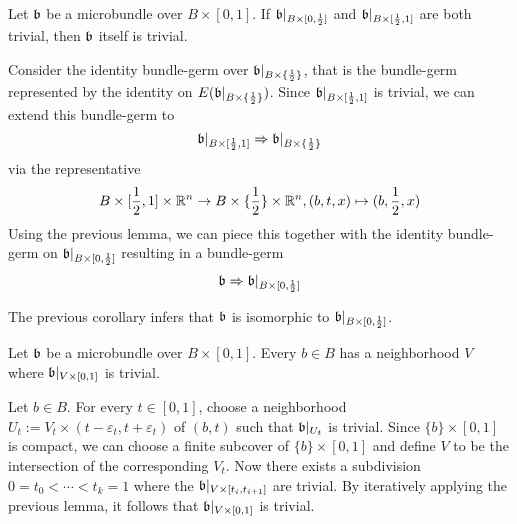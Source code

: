 \begin{file}
\newcommand{\A}[1][] {
    A_\alpha#1
}

\newcommand{\bbleft} {
    \bb\restr{B \times{} [0, \half]}
}
\newcommand{\bbright} {
    \bb\restr{B \times{} [\half, 1]}
}
\newcommand{\bbhalf} {
    \bb\restr{B \times{} \{ \half \}}
}

\begin{mylemma}\label{homotopy::lemma1}
    Let $\mathfrak{b}$ be a microbundle over $B \times [0, 1]$. If $\bbleft$ and $\bbright$ are both trivial,
    then $\mathfrak{b}$ itself is trivial.
\end{mylemma}
\begin{myproof}
    Consider the identity bundle-germ over $\bbhalf$, that is the bundle-germ represented by the identity on $E(\bbhalf)$.
    Since $\bbright$ is trivial, we can extend this bundle-germ to 
    \[ \bbright \double \bbhalf \]
    via the representative
    \[ B \times [\frac{1}{2}, 1] \times \mathbb{R}^n \to B \times \{\frac{1}{2}\} \times \mathbb{R}^n, (b, t, x) \mapsto (b, \frac{1}{2}, x) \]
    Using the previous lemma, we can piece this together with the identity bundle-germ on $\bbleft$ resulting in a bundle-germ
    \[ \bb \double \bbleft \]

    The previous corollary infers that $\mathfrak{b}$ is isomorphic to $\bbleft$.
\end{myproof}

\begin{mylemma}\label{homotopy::lemma2}
    Let $\mathfrak{b}$ be a microbundle over $B \times [0, 1]$.
    Every $b \in B$ has a neighborhood $V$ where $\mathfrak{b}\vert_{V \times [0, 1]}$ is trivial.
\end{mylemma}
\begin{myproof}
    Let $b \in B$.
    For every $t \in [0, 1]$, choose a neighborhood $U_t := V_t \times (t - \varepsilon_t, t + \varepsilon_t)$ of $(b, t)$ such that $\mathfrak{b}\vert_{U_t}$ is trivial.
    Since $\{b\} \times [0, 1]$ is compact, we can choose a finite subcover of $\{b\} \times [0, 1]$ and define $V$ to be the intersection of the corresponding $V_t$.
    Now there exists a subdivision $0 = t_0 < \cdots < t_k = 1$ where the $\mathfrak{b}\vert_{V \times [t_{i}, t_{i + 1}]}$ are trivial.
    By iteratively applying the previous lemma, it follows that $\mathfrak{b}\vert_{V \times [0, 1]}$ is trivial.
\end{myproof}


\end{file}
